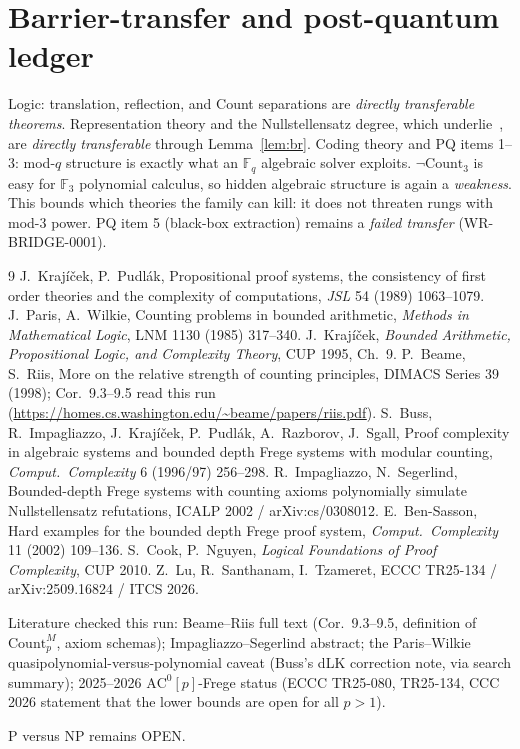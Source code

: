 \documentclass[11pt]{article}
\theoremstyle{definition}
\newcommand{\Count}{\mathrm{Count}}
\begin{document}
\section*{Barrier-transfer and post-quantum ledger}
Logic: translation, reflection, and Count separations are \emph{directly transferable theorems}. Representation theory and the
Nullstellensatz degree, which underlie~\cite{BIKPRS96}, are \emph{directly transferable} through Lemma~\ref{lem:br}. Coding theory and PQ items 1--3:
mod-$q$ structure is exactly what an $\mathbb F_q$ algebraic solver exploits. $\neg\Count_3$ is easy for $\mathbb F_3$ polynomial calculus, so hidden
algebraic structure is again a \emph{weakness}. This bounds which theories the family can kill: it does not threaten rungs with mod-3 power.
PQ item 5 (black-box extraction) remains a \emph{failed transfer} (WR-BRIDGE-0001).

\begin{thebibliography}{9}
 J.~Krajíček, P.~Pudlák, Propositional proof systems, the consistency of first order theories and the complexity of computations, \emph{JSL} 54 (1989) 1063--1079.
 J.~Paris, A.~Wilkie, Counting problems in bounded arithmetic, \emph{Methods in Mathematical Logic}, LNM 1130 (1985) 317--340.
 J.~Krajíček, \emph{Bounded Arithmetic, Propositional Logic, and Complexity Theory}, CUP 1995, Ch.~9.
 P.~Beame, S.~Riis, More on the relative strength of counting principles, DIMACS Series 39 (1998); Cor.~9.3--9.5 read this run (\url{https://homes.cs.washington.edu/~beame/papers/riis.pdf}).
 S.~Buss, R.~Impagliazzo, J.~Krajíček, P.~Pudlák, A.~Razborov, J.~Sgall, Proof complexity in algebraic systems and bounded depth Frege systems with modular counting, \emph{Comput.\ Complexity} 6 (1996/97) 256--298.
 R.~Impagliazzo, N.~Segerlind, Bounded-depth Frege systems with counting axioms polynomially simulate Nullstellensatz refutations, ICALP 2002 / arXiv:cs/0308012.
 E.~Ben-Sasson, Hard examples for the bounded depth Frege proof system, \emph{Comput.\ Complexity} 11 (2002) 109--136.
 S.~Cook, P.~Nguyen, \emph{Logical Foundations of Proof Complexity}, CUP 2010.
 Z.~Lu, R.~Santhanam, I.~Tzameret, ECCC TR25-134 / arXiv:2509.16824 / ITCS 2026.
\end{thebibliography}
\noindent Literature checked this run: Beame--Riis full text (Cor.~9.3--9.5, definition of $\Count^M_p$, axiom schemas);
Impagliazzo--Segerlind abstract; the Paris--Wilkie quasipolynomial-versus-polynomial caveat (Buss's dLK correction note, via search
summary); 2025--2026 $\mathrm{AC}^0[p]$-Frege status (ECCC TR25-080, TR25-134, CCC 2026 statement that the lower bounds are open for all $p>1$).

\noindent P versus NP remains OPEN.
\end{document}
